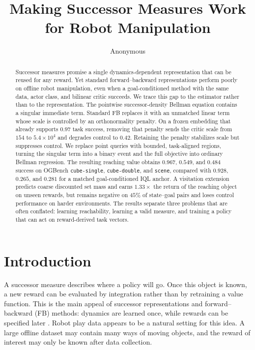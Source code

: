 \documentclass{article}
\title{Making Successor Measures Work for Robot Manipulation}
\author{Anonymous}
\begin{document}
\maketitle

\begin{abstract}
Successor measures promise a single dynamics-dependent representation that can be
reused for any reward. Yet standard forward--backward representations perform
poorly on offline robot manipulation, even when a goal-conditioned method with the
same data, actor class, and bilinear critic succeeds. We trace this gap to the
estimator rather than to the representation. The pointwise successor-density
Bellman equation contains a singular immediate term. Standard FB replaces it with
an unmatched linear term whose scale is controlled by an orthonormality penalty.
On a frozen embedding that already supports $0.97$ task success, removing that
penalty sends the critic scale from $154$ to $5.4\times 10^4$ and degrades control
to $0.42$. Retaining the penalty stabilizes scale but suppresses control. We
replace point queries with bounded, task-aligned regions, turning the singular
term into a binary event and the full objective into ordinary Bellman regression.
The resulting reaching value obtains $0.967$, $0.549$, and $0.484$ success on
OGBench \texttt{cube-single}, \texttt{cube-double}, and \texttt{scene}, compared
with $0.928$, $0.265$, and $0.281$ for a matched goal-conditioned IQL anchor. A
visitation extension predicts coarse discounted set mass and earns $1.33\times$
the return of the reaching object on unseen rewards, but remains negative on
$45\%$ of state--goal pairs and loses control performance on harder environments.
The results separate three problems that are often conflated: learning
reachability, learning a valid measure, and training a policy that can act on
reward-derived task vectors.
\end{abstract}

\section{Introduction}
\label{sec:introduction}

A successor measure describes where a policy will go. Once this object is known,
a new reward can be evaluated by integration rather than by retraining a value
function. This is the main appeal of successor representations and
forward--backward (FB) methods: dynamics are learned once, while rewards can be
specified later \citep{dayan1993improving,touati2021learning,touati2023does}.
Robot play data appears to be a natural setting for this idea. A large offline
dataset may contain many ways of moving objects, and the reward of interest may
only be known after data collection.
\end{document}
